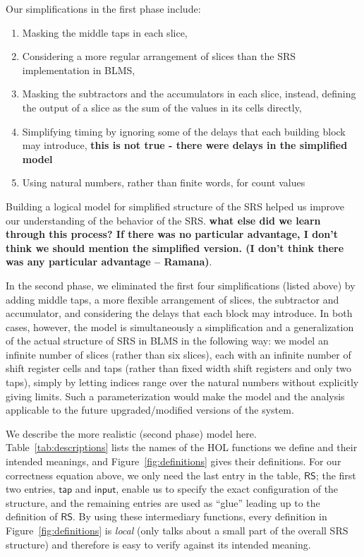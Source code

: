 \documentclass{llncs}
\begin{document}

Our simplifications in the first phase include:
\begin{enumerate}
\item Masking the middle taps in each slice,
\item Considering a more regular arrangement of slices than the SRS implementation in BLMS,
\item Masking the subtractors and the accumulators in each slice, instead, defining the output of a slice as the sum of the values in its cells directly,
\item Simplifying timing by ignoring some of the delays that each building block may introduce, {\bf this is not true - there were delays in the simplified model}
\item Using natural numbers, rather than finite words, for count values
\end{enumerate}

Building a logical model for simplified structure of the SRS helped us improve our understanding of the behavior of the SRS.
{\bf what else did we learn through this process? If there was no particular advantage, I don't think we should mention the simplified version.
(I don't think there was any particular advantage -- Ramana)}.

In the second phase, we eliminated the first four simplifications (listed above) by adding middle taps, a more flexible arrangement of slices, the subtractor and accumulator, and considering the delays that each block may introduce.
In both cases, however, the model is simultaneously a simplification and a generalization of the actual structure of SRS in BLMS in the following way: we model an infinite number of slices (rather than six slices), each with an infinite number of shift register cells and taps (rather than fixed width shift registers and only two taps), simply by letting indices range over the natural numbers without explicitly giving limits.
Such a parameterization would make the model and the analysis applicable to the future upgraded/modified versions of the system.

We describe the more realistic (second phase) model here.
Table~\ref{tab:descriptions} lists the names of the HOL functions we define and their intended meanings, and Figure~\ref{fig:definitions} gives their definitions.
For our correctness equation above, we only need the last entry in the table, $\mathsf{RS}$; the first two entries, $\mathsf{tap}$ and $\mathsf{input}$, enable us to specify the exact configuration of the structure, and the remaining entries are used as ``glue'' leading up to the definition of $\mathsf{RS}$.
By using these intermediary functions, every definition in Figure~\ref{fig:definitions} is \emph{local} (only talks about a small part of the overall SRS structure) and therefore is easy to verify against its intended meaning.
\end{document}
